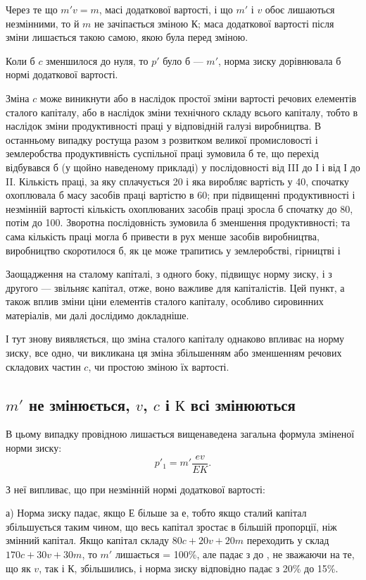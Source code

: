 
Через те що  $m'v = m$, масі додаткової вартості, і що $m'$ і $v$
обоє лишаються незмінними, то й $m$ не зачіпається зміною $К$;
маса додаткової вартості після зміни лишається такою самою,
якою була перед зміною.

Коли б $c$ зменшилося до нуля, то $p'$ було б — $m'$, норма зиску
дорівнювала б нормі додаткової вартості.

Зміна $c$ може виникнути або в наслідок простої зміни вартості
речових елементів сталого капіталу, або в наслідок зміни технічного
складу всього капіталу, тобто в наслідок зміни продуктивності
праці у відповідній галузі виробництва. В останньому
випадку ростуща разом з розвитком великої промисловості і
землеробства продуктивність суспільної праці зумовила б те, що
перехід відбувався б (у щойно наведеному прикладі) у послідовності
від III до І і від І до II. Кількість праці, за яку сплачується
20 і яка виробляє вартість у 40, спочатку охоплювала б масу засобів
праці вартістю в 60; при підвищенні продуктивності і незмінній
вартості кількість охоплюваних засобів праці зросла б спочатку
до 80, потім до 100. Зворотна послідовність зумовила б
зменшення продуктивності; та сама кількість праці могла б привести
в рух менше засобів виробництва, виробництво скоротилося
б, як це може трапитись у землеробстві, гірництві і~

Заощадження на сталому капіталі, з одного боку, підвищує
норму зиску, і з другого — звільняє капітал, отже, воно важливе
для капіталістів. Цей пункт, а також вплив зміни ціни елементів
сталого капіталу, особливо сировинних матеріалів, ми далі дослідимо
докладніше.

І тут знову виявляється, що зміна сталого капіталу однаково
впливає на норму зиску, все одно, чи викликана ця зміна збільшенням
або зменшенням речових складових частин $c$, чи простою
зміною їх вартості.

\subsection{$m'$ не змінюється, $v$, $c$ і $К$ всі змінюються}

В цьому випадку провідною лишається вищенаведена загальна
формула зміненої норми зиску:
\[
p'_1 = m'\frac{ev}{EK}.
\]

З неї випливає, що при незмінній нормі додаткової вартості:

а) Норма зиску падає, якщо $Е$ більше за $е$, тобто якщо сталий
капітал збільшується таким чином, що весь капітал зростає
в більшій пропорції, ніж змінний капітал. Якщо капітал складу
$80 c + 20 v + 20 m$ переходить у склад $170 c + 30 v + 30 m$, то $m'$
лишається = 100\%, але падає з  до , не
зважаючи на те,
що як $v$, так і $К$, збільшились, і норма зиску відповідно падає з
20\% до 15\%.
